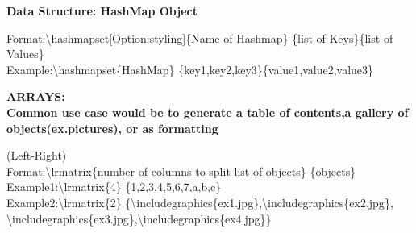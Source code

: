 \documentclass{article}
\begin{document}
\begin{center}
\begin{adjustbox}{height=0.6\paperheight,width=\paperwidth,center,keepaspectratio}
\end{adjustbox}
\end{center}
\newpage
\begin{center}
\textbf{{\Large Data Structure: HashMap Object}}
\end{center}
Format:{\textbackslash}hashmapset[Option:styling]{\{}Name of Hashmap{\} }{\{}list of Keys{\}}{\{}list of Values{\}}\\
Example:{\textbackslash}hashmapset{\{}HashMap{\} }{\{}key1,key2,key3{\}}{\{}value1,value2,value3{\}}\newline \\
\begin{adjustbox}{width=0.5\paperwidth,center,keepaspectratio}
\end{adjustbox}
\newpage
\begin{center}
\textbf{{\Large ARRAYS:} \\
Common use case would be to generate a table of contents,a gallery of objects(ex.pictures), or as formatting}
\end{center}
(Left-Right)\\ 
Format:{\textbackslash}lrmatrix{\{}number of columns to split list of objects{\} }{\{}objects{\}}\\
Example1:{\textbackslash}lrmatrix{\{}4{\} }{\{}1,2,3,4,5,6,7,a,b,c{\}}\\
Example2:{\textbackslash}lrmatrix{\{}2{\} }{\{}{\textbackslash}includegraphics{\{}ex1.jpg{\}},{\textbackslash}includegraphics{\{}ex2.jpg{\}},\\{\textbackslash}includegraphics{\{}ex3.jpg{\}},{\textbackslash}includegraphics{\{}ex4.jpg{\}}{\}}\newline \\
\end{document}

